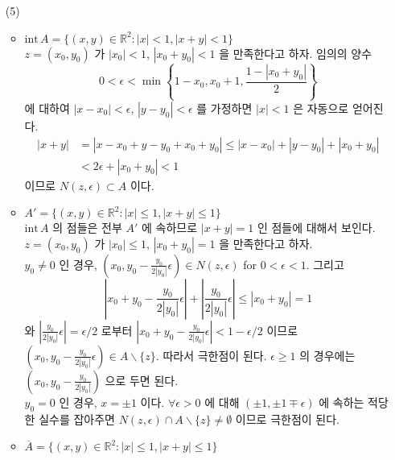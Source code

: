 \documentclass[12pt]{report}
\newcommand{\abs}[1]{\left|#1\right|}
\newcommand{\inte}{\mathrm{int}\,}
\newcommand{\bs}{\backslash}
\newcommand{\R}{\mathbb{R}}
\begin{document}
\begin{enumerate}
\begin{enumerate}
	\item[(5)]
	\begin{itemize}
		\item $\inte A = \{(x, y)\in \R^2: \abs{x} < 1, \abs{x+y}<1 \}$\\
		$z = (x_0, y_0)$ 가 $\abs{x_0} < 1$, $\abs{x_0+y_0} <1$ 을 만족한다고 하자. 임의의 양수 $$0 < \epsilon < \min\left\{1-x_0, x_0 + 1, \frac{1-\abs{x_0+y_0}}{2} \right\}$$
		에 대하여 $\abs{x-x_0} < \epsilon$, $\abs{y - y_0} < \epsilon$ 를 가정하면 $\abs{x} < 1$ 은 자동으로 얻어진다.\\
		$$\begin{aligned}
			\abs{x+y} &= \abs{x - x_0 + y - y_0 + x_0 + y_0} \leq \abs{x-x_0} + \abs{y-y_0} + \abs{x_0+y_0}\\
			&< 2\epsilon + \abs{x_0+y_0} < 1
		\end{aligned}$$
		이므로 $N(z, \epsilon) \subset A$ 이다.
		\item $A' = \{(x, y)\in \R^2: \abs{x} \leq 1, \abs{x+y} \leq 1 \}$\\
		$\inte A$ 의 점들은 전부 $A'$ 에 속하므로 $\abs{x+y} = 1$ 인 점들에 대해서 보인다.\\
		$z = (x_0, y_0)$ 가 $\abs{x_0} \leq 1$, $\abs{x_0+y_0} = 1$ 을 만족한다고 하자.\\
		$y_0 \neq 0$ 인 경우, $(x_0, y_0 - \frac{y_0}{2\abs{y_0}}\epsilon) \in N(z, \epsilon)$ for $0 < \epsilon < 1$. 그리고 $$\abs{x_0 + y_0 - \frac{y_0}{2\abs{y_0}}\epsilon} + \abs{\frac{y_0}{2\abs{y_0}}\epsilon}\leq \abs{x_0+y_0} = 1$$
		와 $\abs{\frac{y_0}{2\abs{y_0}}\epsilon} = \epsilon/2$ 로부터 $\abs{x_0 + y_0 - \frac{y_0}{2\abs{y_0}}\epsilon} < 1- \epsilon/2$ 이므로 $(x_0, y_0 - \frac{y_0}{2\abs{y_0}}\epsilon)\in A\bs \{z\}$. 따라서 극한점이 된다. $\epsilon \geq 1$ 의 경우에는 $(x_0, y_0 - \frac{y_0}{2\abs{y_0}})$ 으로 두면 된다.  \\
		$y_0 = 0$ 인 경우, $x = \pm 1$ 이다. $\forall \epsilon > 0$ 에 대해 $(\pm 1, \pm1 \mp \epsilon)$ 에 속하는 적당한 실수를 잡아주면 $N(z, \epsilon) \cap A\bs \{z\} \neq \emptyset$ 이므로 극한점이 된다.
		\item $\overline{A} = \{(x, y)\in \R^2: \abs{x} \leq 1, \abs{x+y} \leq 1 \}$
	\end{itemize}
\end{enumerate}


\end{enumerate}
\end{document}
